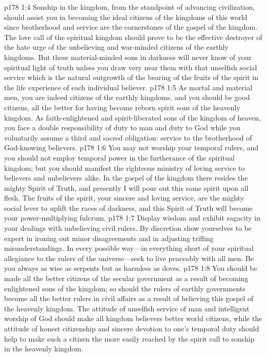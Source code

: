\vs p178 1:4 Sonship in the kingdom, from the standpoint of advancing civilization, should assist you in becoming the ideal citizens of the kingdoms of this world since brotherhood and service are the cornerstones of the gospel of the kingdom. The love call of the spiritual kingdom should prove to be the effective destroyer of the hate urge of the unbelieving and war\hyp{}minded citizens of the earthly kingdoms. But these material\hyp{}minded sons in darkness will never know of your spiritual light of truth unless you draw very near them with that unselfish social service which is the natural outgrowth of the bearing of the fruits of the spirit in the life experience of each individual believer.
\vs p178 1:5 As mortal and material men, you are indeed citizens of the earthly kingdoms, and you should be good citizens, all the better for having become reborn spirit sons of the heavenly kingdom. As faith\hyp{}enlightened and spirit\hyp{}liberated sons of the kingdom of heaven, you face a double responsibility of duty to man and duty to God while you voluntarily assume a third and sacred obligation: service to the brotherhood of God\hyp{}knowing believers.
\vs p178 1:6 You may not worship your temporal rulers, and you should not employ temporal power in the furtherance of the spiritual kingdom; but you should manifest the righteous ministry of loving service to believers and unbelievers alike. In the gospel of the kingdom there resides the mighty Spirit of Truth, and presently I will pour out this same spirit upon all flesh. The fruits of the spirit, your sincere and loving service, are the mighty social lever to uplift the races of darkness, and this Spirit of Truth will become your power\hyp{}multiplying fulcrum.
\vs p178 1:7 Display wisdom and exhibit sagacity in your dealings with unbelieving civil rulers. By discretion show yourselves to be expert in ironing out minor disagreements and in adjusting trifling misunderstandings. In every possible way---in everything short of your spiritual allegiance to the rulers of the universe---seek to live peaceably with all men. Be you always as wise as serpents but as harmless as doves.
\vs p178 1:8 You should be made all the better citizens of the secular government as a result of becoming enlightened sons of the kingdom; so should the rulers of earthly governments become all the better rulers in civil affairs as a result of believing this gospel of the heavenly kingdom. The attitude of unselfish service of man and intelligent worship of God should make all kingdom believers better world citizens, while the attitude of honest citizenship and sincere devotion to one’s temporal duty should help to make such a citizen the more easily reached by the spirit call to sonship in the heavenly kingdom.
